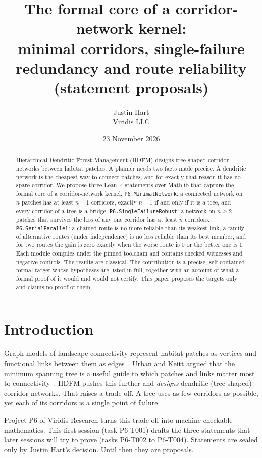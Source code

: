 \documentclass[11pt]{article}
\title{The formal core of a corridor-network kernel:\\ minimal corridors, single-failure redundancy and route reliability (statement proposals)}
\author{Justin Hart\\Viridis LLC}
\date{23 November 2026}
\begin{document}
\maketitle

\begin{abstract}
Hierarchical Dendritic Forest Management (HDFM) designs tree-shaped corridor networks between
habitat patches. A planner needs two facts made precise. A dendritic network is the cheapest way to
connect patches, and for exactly that reason it has no spare corridor. We propose three Lean~4
statements over Mathlib that capture the formal core of a corridor-network kernel.
\texttt{P6.MinimalNetwork}: a connected network on $n$ patches has at least $n-1$ corridors, exactly
$n-1$ if and only if it is a tree, and every corridor of a tree is a bridge.
\texttt{P6.SingleFailureRobust}: a network on $n\ge 2$ patches that survives the loss of any one
corridor has at least $n$ corridors.
\texttt{P6.SerialParallel}: a chained route is no more reliable than its weakest link, a
family of alternative routes (under independence) is no less reliable than its best member, and for
two routes the gain is zero exactly when the worse route is $0$ or the better one is $1$. Each
module compiles under the pinned toolchain and contains checked witnesses and negative controls.
The results are classical. The contribution is a precise, self-contained formal target whose
hypotheses are listed in full, together with an account of what a formal proof of it would and would not
certify. This paper proposes the targets only and claims no proof of them.
\end{abstract}

\section{Introduction}
Graph models of landscape connectivity represent habitat patches as vertices and functional
links between them as edges~\citep{urbankeitt2001}. Urban and Keitt argued that the minimum spanning tree is a useful guide to
which patches and links matter most to connectivity~\citep{urbankeitt2001}. HDFM pushes this
further and \emph{designs} dendritic (tree-shaped) corridor networks. That raises a trade-off. A tree uses as
few corridors as possible, yet each of its corridors is a single point of failure.

Project P6 of Viridis Research turns this trade-off into machine-checkable mathematics. This first session
(task P6-T001) drafts the three statements that later sessions will try to prove (tasks
P6-T002 to P6-T004). Statements are sealed only by Justin Hart's decision. Until then they are
proposals.
\end{document}
